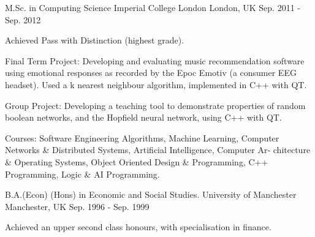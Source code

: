 

\begin{cventries}


  \cventry
    {M.Sc. in Computing Science} %
    {Imperial College London} %
    {London, UK} %
    {Sep. 2011 - Sep. 2012} %
    {
      \begin{cvitems} %
        \item {Achieved Pass with Distinction (highest grade).}
        \item {Final Term Project: Developing and evaluating music recommendation software using emotional responses as recorded by the Epoc Emotiv (a
        consumer EEG headset). Used a k nearest neighbour algorithm, implemented in C++ with QT.}
        \item {Group Project: Developing a teaching tool to demonstrate properties of random boolean networks, and the Hopfield neural network, using C++
        with QT.}
        \item {Courses: Software Engineering Algorithms, Machine Learning, Computer Networks \& Distributed Systems, Artificial Intelligence, Computer Ar‑
        chitecture \& Operating Systems, Object Oriented Design \& Programming, C++ Programming, Logic \& AI Programming.}
      \end{cvitems}
    }
    

  \cventry
    {B.A.(Econ) (Hons) in Economic and Social Studies.} %
    {University of Manchester} %
    {Manchester, UK} %
    {Sep. 1996 - Sep. 1999} %
    {
      \begin{cvitems} %
        \item {Achieved an upper second class honours, with specialisation in finance.}
      \end{cvitems}
    }

\end{cventries}
